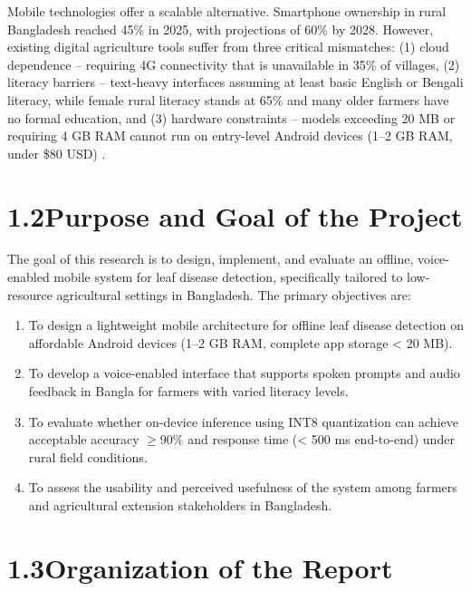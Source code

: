 \documentclass[12pt,letterpaper]{report}
\begin{document}
Mobile technologies offer a scalable alternative. Smartphone ownership in rural Bangladesh reached 45\% in 2025, with projections of 60\% by 2028. However, existing digital agriculture tools suffer from three critical mismatches: (1) cloud dependence – requiring 4G connectivity that is unavailable in 35\% of villages, (2) literacy barriers – text-heavy interfaces assuming at least basic English or Bengali literacy, while female rural literacy stands at 65\% and many older farmers have no formal education, and (3) hardware constraints – models exceeding 20 MB or requiring 4 GB RAM cannot run on entry-level Android devices (1–2 GB RAM, under \$80 USD) \cite{ref15}.

\section*{1.2\hspace{12pt}Purpose and Goal of the Project}

The goal of this research is to design, implement, and evaluate an offline, voice-enabled mobile system for leaf disease detection, specifically tailored to low-resource agricultural settings in Bangladesh. The primary objectives are:

\begin{enumerate}
    \item To design a lightweight mobile architecture for offline leaf disease detection on affordable Android devices (1–2 GB RAM, complete app storage < 20 MB).
    \item To develop a voice-enabled interface that supports spoken prompts and audio feedback in Bangla for farmers with varied literacy levels.
    \item To evaluate whether on-device inference using INT8 quantization can achieve acceptable accuracy $\geq 90\%$ and response time (< 500 ms end-to-end) under rural field conditions.
    \item To assess the usability and perceived usefulness of the system among farmers and agricultural extension stakeholders in Bangladesh.
\end{enumerate}

\section*{1.3\hspace{12pt}Organization of the Report}
\end{document}
